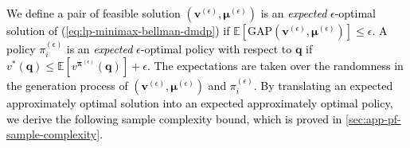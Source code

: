 \documentclass[12pt]{article}
\newtheorem{lemma}{Lemma}
\begin{document}
\textcolor{black}{We define a pair of feasible solution $(\boldsymbol{v}^{(\epsilon)},\boldsymbol{\mu}^{(\epsilon)})$ is an \textit{expected} $\epsilon$-optimal solution of (\ref{eq:lp-minimax-bellman-dmdp}) if $\mathbb{E}[\text{GAP}(\boldsymbol{v}^{(\epsilon)},\boldsymbol{\mu}^{(\epsilon)})] \le \epsilon$. A policy $\pi_i^{(\epsilon)}$ is an \textit{expected} $\epsilon$-optimal policy with respect to $\boldsymbol{q}$ if $ v^*(\boldsymbol{q}) \le \mathbb{E}[v^{\boldsymbol{\pi}^{(\epsilon)}}(\boldsymbol{q})]  + \epsilon$. The expectations are taken over the randomness in the generation process of $(\boldsymbol{v}^{(\epsilon)},\boldsymbol{\mu}^{(\epsilon)})$ and $\pi_i^{(\epsilon)}$. By translating an expected approximately optimal solution into an expected approximately optimal policy, we derive the following sample complexity bound, which is proved in \ref{sec:app-pf-sample-complexity}.}



\end{document}
